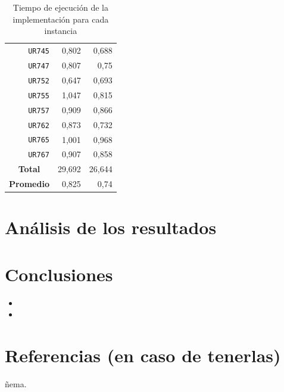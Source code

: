 \documentclass[11pt]{article}
\begin{document}
\begin{table}[htbp]
\begin{center}
\begin{tabular}{|r|r|r|}
   \texttt{UR745} & 0,802 & 0,688 \\
   \texttt{UR747} & 0,807 & 0,75 \\
   \texttt{UR752} & 0,647 & 0,693 \\
   \texttt{UR755} & 1,047 & 0,815 \\
   \texttt{UR757} & 0,909 & 0,866 \\
   \texttt{UR762} & 0,873 & 0,732 \\
   \texttt{UR765} & 1,001 & 0,968 \\
   \texttt{UR767} & 0,907 & 0,858 \\ \hline
   \multicolumn{1}{|c|}{\textbf{Total}} & 29,692 & 26,644 \\ \hline
   \multicolumn{1}{|c|}{\textbf{Promedio}} & 0,825 & 0,74 \\ \hline
   \end{tabular}
   \end{center}
   \caption{Tiempo de ejecución de la implementación para cada instancia}
   \label{tablaTiempos}
\end{table}
   

\section{Análisis de los resultados}


\section{Conclusiones}

\begin{itemize}
   \item 
   \item 
\end{itemize}

\section{Referencias (en caso de tenerlas)}

ñema. \\
\end{document}
